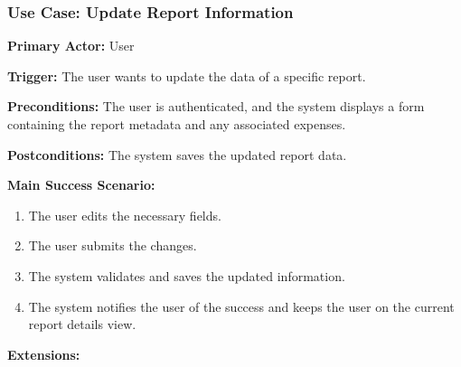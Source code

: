 \subsubsection{\textbf{Use Case: Update Report Information}}

\textbf{Primary Actor:} User

\textbf{Trigger:} The user wants to update the data of a specific report.

\textbf{Preconditions:} The user is authenticated, and the system displays a form containing the report metadata and any associated expenses.

\textbf{Postconditions:} The system saves the updated report data.

\vspace{0.5cm}

\textbf{Main Success Scenario:}

\begin{enumerate} [leftmargin=0.75cm, noitemsep]
\item The user edits the necessary fields.
\item The user submits the changes.
\item The system validates and saves the updated information.
\item The system notifies the user of the success and keeps the user on the current report details view.
\end{enumerate}

\vspace{0.3cm}

\textbf{Extensions:}


